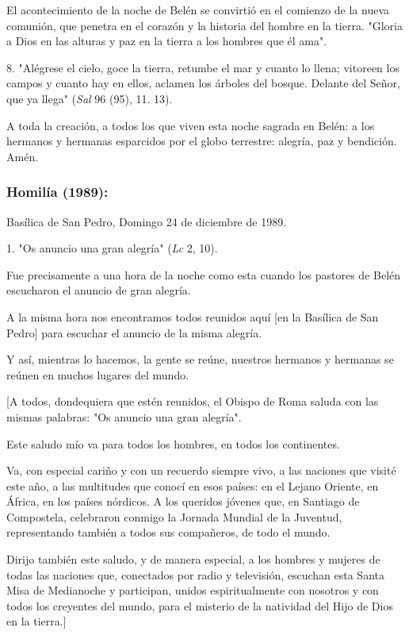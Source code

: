 \begin{body}
\begin{body}
El acontecimiento de la noche de Belén se convirtió en el comienzo de la nueva comunión, que penetra en el corazón y la historia del hombre en la tierra. "Gloria a Dios en las alturas y paz en la tierra a los hombres que él ama".

8. "Alégrese el cielo, goce la tierra, retumbe el mar y cuanto lo llena; vitoreen los campos y cuanto hay en ellos, aclamen los árboles del bosque. Delante del Señor, que ya llega" (\emph{Sal} 96 (95), 11. 13).

A toda la creación, a todos los que viven esta noche sagrada en Belén: a los hermanos y hermanas esparcidos por el globo terrestre: alegría, paz y bendición. Amén.
\end{body} 
	
\subsubsection{Homilía (1989): }

Basílica de San Pedro, Domingo 24 de diciembre de 1989.

\begin{body} 
1. "Os anuncio una gran alegría" (\emph{Lc} 2, 10).

Fue precisamente a una hora de la noche como esta cuando los pastores de Belén escucharon el anuncio de gran alegría.

A la misma hora nos encontramos todos reunidos aquí {[}en la Basílica de San Pedro{]} para escuchar el anuncio de la misma alegría.

Y así, mientras lo hacemos, la gente se reúne, nuestros hermanos y hermanas se reúnen en muchos lugares del mundo.

{[}A todos, dondequiera que estén reunidos, el Obispo de Roma saluda con las mismas palabras: "Os anuncio una gran alegría".

Este saludo mío va para todos los hombres, en todos los continentes.

Va, con especial cariño y con un recuerdo siempre vivo, a las naciones que visité este año, a las multitudes que conocí en esos países: en el Lejano Oriente, en África, en los países nórdicos. A los queridos jóvenes que, en Santiago de Compostela, celebraron conmigo la Jornada Mundial de la Juventud, representando también a todos sus compañeros, de todo el mundo.

Dirijo también este saludo, y de manera especial, a los hombres y mujeres de todas las naciones que, conectados por radio y televisión, escuchan esta Santa Misa de Medianoche y participan, unidos espiritualmente con nosotros y con todos los creyentes del mundo, para el misterio de la natividad del Hijo de Dios en la tierra.{]}


\end{body}
\end{body}
